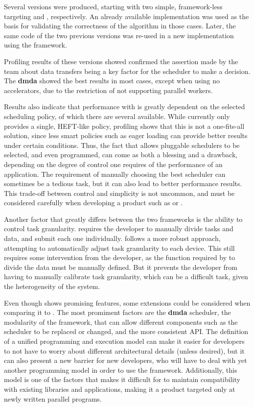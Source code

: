 \documentclass[main.tex]{subfiles}
\begin{document}
Several versions were produced, starting with two simple, framework-less targeting \cpus and \gpus, respectively. An already available implementation was used as the basis for validating the correctness of the algorithm in those cases. Later, the same code of the two previous versions was re-used in a new implementation using the \starpu framework.

Profiling results of these versions showed confirmed the assertion made by the \starpu team about data transfers being a key factor for the scheduler to make a decision. The \textbf{dmda} showed the best results in most cases, except when using no accelerators, due to the restriction of not supporting parallel workers.

Results also indicate that performance with \starpu is greatly dependent on the selected scheduling policy, of which there are several available. While \gama currently only provides a single, \acs{HEFT}-like policy, profiling shows that this is not a one-fits-all solution, since less smart policies such as eager loading can provide better results under certain conditions. Thus, the fact that \starpu allows pluggable schedulers to be selected, and even programmed, can come as both a blessing and a drawback, depending on the degree of control one requires of the performance of an application. The requirement of manually choosing the best scheduler can sometimes be a tedious task, but it can also lead to better performance results. This trade-off between control and simplicity is not uncommon, and must be considered carefully when developing a product such as \starpu or \gama.

Another factor that greatly differs between the two frameworks is the ability to control task granularity. \starpu requires the developer to manually divide tasks and data, and submit each one individually. \gama follows a more robust approach, attempting to automatically adjust task granularity to each device. This still requires some intervention from the developer, as the function required by \gama to divide the data must be manually defined. But it prevents the developer from having to manually calibrate task granularity, which can be a difficult task, given the heterogeneity of the system.

Even though \gama shows promising features, some extensions could be considered when comparing it to \starpu. The most promiment factors are the \textbf{dmda} scheduler, the modularity of the framework, that can allow different components such as the scheduler to be replaced or changed, and the more consistent API. The definition of a unified programming and execution model can make it easier for developers to not have to worry about different architectural details (unless desired), but it can also present a new barrier for new developers, who will have to deal with yet another programming model in order to use the framework. Additionally, this model is one of the factors that makes it difficult for \gama to maintain compatibility with existing libraries and applications, making it a product targeted only at newly written parallel programs.
\end{document}
